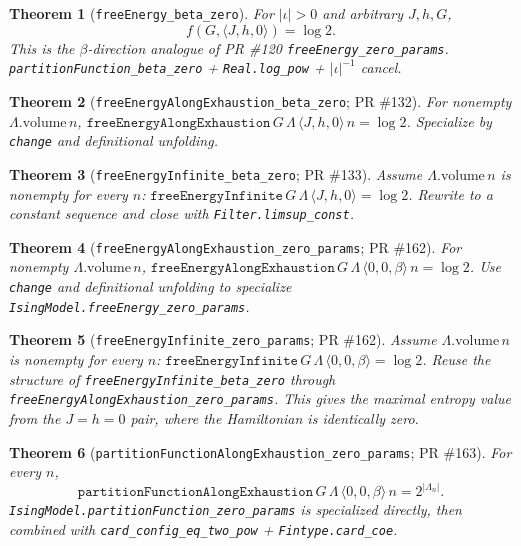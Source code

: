 \documentclass[a4paper,11pt]{article}
\newtheorem{theorem}{Theorem}
\begin{document}
\begin{theorem}[\texttt{freeEnergy\_beta\_zero}]
For $|\iota| > 0$ and arbitrary $J, h, G$,
\[
  f(G, \langle J, h, 0 \rangle) = \log 2.
\]
This is the $\beta$-direction analogue of PR \#120
\texttt{freeEnergy\_zero\_params}.
\texttt{partitionFunction\_beta\_zero} + \texttt{Real.log\_pow} + $|\iota|^{-1}$ cancel.
\end{theorem}

\begin{theorem}[\texttt{freeEnergyAlongExhaustion\_beta\_zero}; PR \#132]
For nonempty $\Lambda.\text{volume}\,n$,
$\texttt{freeEnergyAlongExhaustion}\,G\,\Lambda\,\langle J, h, 0 \rangle\,n = \log 2$.
Specialize by \texttt{change} and definitional unfolding.
\end{theorem}

\begin{theorem}[\texttt{freeEnergyInfinite\_beta\_zero}; PR \#133]
Assume $\Lambda.\text{volume}\,n$ is nonempty for every $n$:
$\texttt{freeEnergyInfinite}\,G\,\Lambda\,\langle J, h, 0 \rangle = \log 2$.
Rewrite to a constant sequence and close with \texttt{Filter.limsup\_const}.
\end{theorem}

\begin{theorem}[\texttt{freeEnergyAlongExhaustion\_zero\_params}; PR \#162]
For nonempty $\Lambda.\text{volume}\,n$,
$\texttt{freeEnergyAlongExhaustion}\,G\,\Lambda\,\langle 0, 0, \beta \rangle\,n = \log 2$.
Use \texttt{change} and definitional unfolding to specialize
\texttt{IsingModel.freeEnergy\_zero\_params}.
\end{theorem}

\begin{theorem}[\texttt{freeEnergyInfinite\_zero\_params}; PR \#162]
Assume $\Lambda.\text{volume}\,n$ is nonempty for every $n$:
$\texttt{freeEnergyInfinite}\,G\,\Lambda\,\langle 0, 0, \beta \rangle = \log 2$.
Reuse the structure of \texttt{freeEnergyInfinite\_beta\_zero} through
\texttt{freeEnergyAlongExhaustion\_zero\_params}. This gives the maximal
entropy value from the $J = h = 0$ pair, where the Hamiltonian is
identically zero.
\end{theorem}

\begin{theorem}[\texttt{partitionFunctionAlongExhaustion\_zero\_params}; PR \#163]
For every $n$,
\[
  \texttt{partitionFunctionAlongExhaustion}\,G\,\Lambda\,\langle 0, 0, \beta \rangle\,n
    = 2^{|\Lambda_n|}.
\]
\texttt{IsingModel.partitionFunction\_zero\_params} is specialized directly,
then combined with
\texttt{card\_config\_eq\_two\_pow} + \texttt{Fintype.card\_coe}.
\end{theorem}
\end{document}
